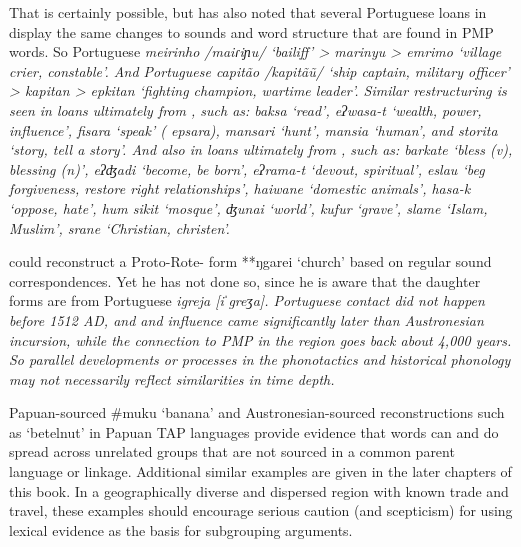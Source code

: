 That is certainly possible,
but \citet[81]{Grimes1991c} has also noted that several Portuguese
loans in  display the same changes to sounds
and word structure that are found in PMP words.
So Portuguese \it{meirinho} /maiɾiɲu/ ‘bailiff’ >  \it{marinyu}
>  \it{emrimo} ‘village crier, constable’.
And Portuguese \it{capitão} /kapitãũ/ ‘ship captain,
military officer’ >  \it{kapitan} >  \it{epkitan} ‘fighting champion, wartime leader’.
Similar restructuring is seen in  loans ultimately from ,
such as: \it{baksa} ‘read’,
\it{eʔwasa-t} ‘wealth, power, influence’, \it{fisara} ‘speak’
( \it{epsara}), \it{mansari} ‘hunt’, \it{mansia} ‘human’,
and \it{storita} ‘story, tell a story’.
And also in  loans ultimately from ,
such as: \it{barkate} ‘bless (v),
blessing (n)’, \it{eʔʤadi} ‘become,
be born’, \it{eʔrama-t} ‘devout,
spiritual’, \it{eslau} ‘beg forgiveness, restore right relationships’,
\it{haiwane} ‘domestic animals’, \it{hasa-k} ‘oppose,
hate’, \it{hum sikit} ‘mosque’, \it{ʤunai} ‘world’,
\it{kufur} ‘grave’, \it{slame} ‘Islam,
Muslim’, \it{srane} ‘Christian, christen’.

\citet[397]{Edwards2021} could reconstruct a Proto-Rote- form **ŋgarei ‘church’
based on regular sound correspondences.
Yet he has not done so,
since he is aware that the daughter forms are from Portuguese \it{igreja} [iˈgreʒa].
Portuguese contact did not happen before 1512 AD,
and  and  influence came significantly later than
Austronesian incursion, while the connection to PMP in the region goes back about 4,000 years.
So parallel developments or processes in the phonotactics
and historical phonology may not necessarily reflect similarities in time depth.

Papuan-sourced {\#}muku ‘banana’ and Austronesian-sourced reconstructions
such as ‘betelnut’ in Papuan TAP languages provide evidence that
words can and do spread across unrelated groups that are not sourced in
a common parent language or linkage.
Additional similar examples are given in the later chapters of this book.
In a geographically diverse
and dispersed region with known trade
and travel, these examples should encourage serious caution (and
scepticism) for using lexical evidence as the basis for subgrouping arguments.

